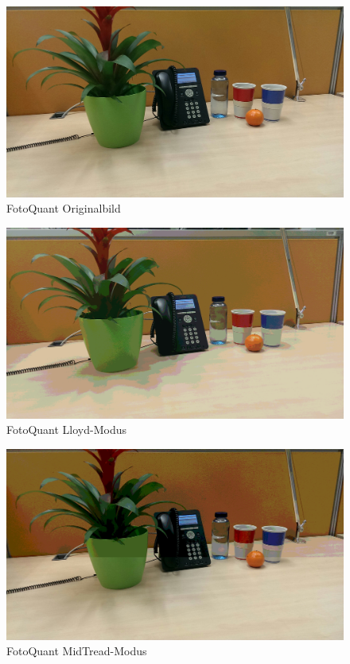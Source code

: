 \begin{landscape}

\begin{figure}[h]
	\centering
		\includegraphics[width=1.4\textwidth]{img/Fotos/FotoQuant_Original.jpg}
	\caption[FotoQuant Original]{FotoQuant Originalbild}
	\label{fig:quant_ori}
\end{figure}

\begin{figure}[h]
	\centering
		\includegraphics[width=1.4\textwidth]{img/Fotos/FotoQuant_Lloyd.jpg}
	\caption[FotoQuant Lloyd]{FotoQuant Lloyd-Modus}
	\label{fig:quant_lloyd}
\end{figure}

\begin{figure}[h]
	\centering
		\includegraphics[width=1.4\textwidth]{img/Fotos/FotoQuant_Midtread.jpg}
	\caption[FotoQuant MidTread]{FotoQuant MidTread-Modus}
	\label{fig:quant_mid}
\end{figure}


\end{landscape}
